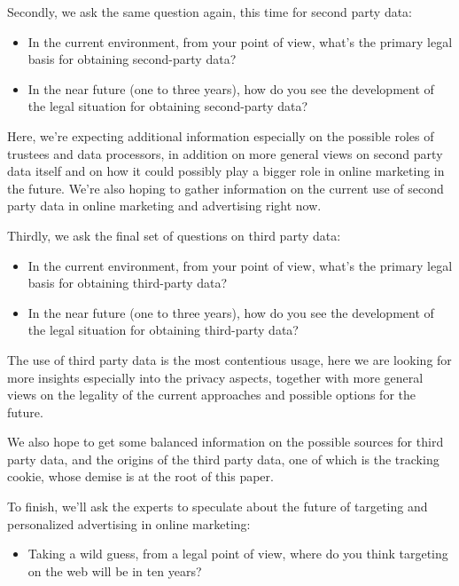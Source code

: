 Secondly, we ask the same question again, this time for second party data:

\begin{itemize} 
 \item In the current environment, from your point of view, what's the primary legal basis for obtaining second-party data?
 \item In the near future (one to three years), how do you see the development of the legal situation for obtaining second-party data?
\end{itemize}

Here, we're expecting additional information especially on the possible roles of trustees and data processors, in addition on more general views on second party data itself and on how it could possibly play a bigger role in online marketing in the future. We're also hoping to gather information on the current use of second party data in online marketing and advertising right now.
 
Thirdly, we ask the final set of questions on third party data:

\begin{itemize} 
 \item In the current environment, from your point of view, what's the primary legal basis for obtaining third-party data?
 \item In the near future (one to three years), how do you see the development of the legal situation for obtaining third-party data?
\end{itemize} 
 
The use of third party data is the most contentious usage, here we are looking for more insights especially into the privacy aspects, together with more general views on the legality of the current approaches and possible options for the future.

We also hope to get some balanced information on the possible sources for third party data, and the origins of the third party data, one of which is the tracking cookie, whose demise is at the root of this paper.

To finish, we'll ask the experts to speculate about the future of targeting and personalized advertising in online marketing:
 
\begin{itemize} 
 \item Taking a wild guess, from a legal point of view, where do you think targeting on the web will be in ten years?
\end{itemize}

